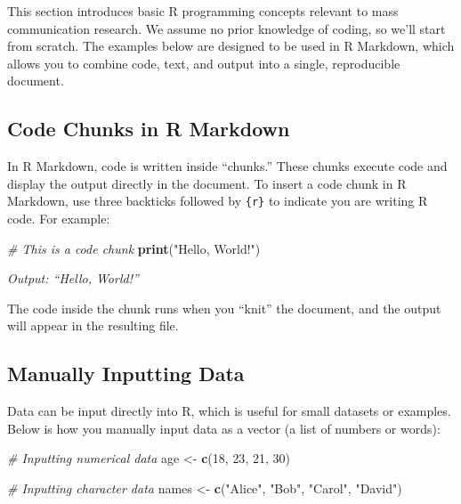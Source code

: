 \documentclass[
]{book}
\newenvironment{Shaded}{\begin{snugshade}}{\end{snugshade}}
\newcommand{\CommentTok}[1]{\textcolor[rgb]{0.56,0.35,0.01}{\textit{#1}}}
\newcommand{\DecValTok}[1]{\textcolor[rgb]{0.00,0.00,0.81}{#1}}
\newcommand{\FunctionTok}[1]{\textcolor[rgb]{0.13,0.29,0.53}{\textbf{#1}}}
\newcommand{\NormalTok}[1]{#1}
\newcommand{\OtherTok}[1]{\textcolor[rgb]{0.56,0.35,0.01}{#1}}
\newcommand{\StringTok}[1]{\textcolor[rgb]{0.31,0.60,0.02}{#1}}
\begin{document}
This section introduces basic R programming concepts relevant to mass communication research. We assume no prior knowledge of coding, so we'll start from scratch. The examples below are designed to be used in R Markdown, which allows you to combine code, text, and output into a single, reproducible document.

\subsection*{Code Chunks in R Markdown}\label{code-chunks-in-r-markdown}

In R Markdown, code is written inside ``chunks.'' These chunks execute code and display the output directly in the document. To insert a code chunk in R Markdown, use three backticks followed by \texttt{\{r\}} to indicate you are writing R code. For example:

\begin{Shaded}
\begin{Highlighting}[]
\CommentTok{\# This is a code chunk}
\FunctionTok{print}\NormalTok{(}\StringTok{"Hello, World!"}\NormalTok{)}
\end{Highlighting}
\end{Shaded}

\emph{Output: ``Hello, World!''}

The code inside the chunk runs when you ``knit'' the document, and the output will appear in the resulting file.

\subsection*{Manually Inputting Data}\label{manually-inputting-data}

Data can be input directly into R, which is useful for small datasets or examples. Below is how you manually input data as a vector (a list of numbers or words):

\begin{Shaded}
\begin{Highlighting}[]
\CommentTok{\# Inputting numerical data}
\NormalTok{age }\OtherTok{\textless{}{-}} \FunctionTok{c}\NormalTok{(}\DecValTok{18}\NormalTok{, }\DecValTok{23}\NormalTok{, }\DecValTok{21}\NormalTok{, }\DecValTok{30}\NormalTok{)}

\CommentTok{\# Inputting character data}
\NormalTok{names }\OtherTok{\textless{}{-}} \FunctionTok{c}\NormalTok{(}\StringTok{"Alice"}\NormalTok{, }\StringTok{"Bob"}\NormalTok{, }\StringTok{"Carol"}\NormalTok{, }\StringTok{"David"}\NormalTok{)}
\end{Highlighting}
\end{Shaded}
\end{document}
